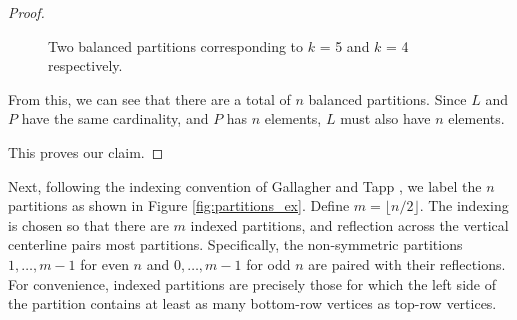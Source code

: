 \documentclass{amsart}
\theoremstyle{definition}
\begin{document}
\begin{proof}
\begin{figure}[H]
    \caption{Two balanced partitions corresponding to $k$ = 5 and $k$ = 4 respectively.}
    \label{fig:balancedpartitionex}
\end{figure}

    From this, we can see that there are a total of $n$ balanced partitions. Since $L$ and $P$ have the same cardinality, and $P$ has $n$ elements, $L$ must also have $n$ elements. 

    \par
    This proves our claim.
    \end{proof}

Next, following the indexing convention of Gallagher and Tapp \cite{gal25}, we label the $n$ partitions as shown in Figure \ref{fig:partitions_ex}. Define $m=\lfloor n/2\rfloor$. The indexing is chosen so that there are $m$ indexed partitions, and reflection across the vertical centerline pairs most partitions. Specifically, the non-symmetric partitions $1,\dots,m-1$ for even $n$ and $0,\dots,m-1$ for odd $n$ are paired with their reflections. For convenience, indexed partitions are precisely those for which the left side of the partition contains at least as many bottom-row vertices as top-row vertices.
\end{document}
